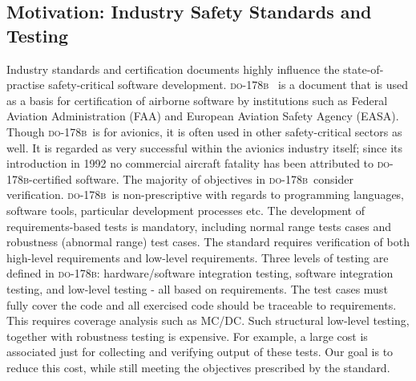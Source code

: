 \documentclass[sttt,final]{svjour}
\newcommand{\DOB}{\textsc{do-178b}}
\begin{document}
\subsection{Motivation: Industry Safety Standards and Testing}
Industry standards and certification documents highly influence the
state-of-practise safety-critical software development. \DOB\
\cite{do178b} is a document that is used as a basis for certification
of airborne software by institutions such as Federal Aviation
Administration (FAA) and European Aviation Safety Agency
(EASA). Though \DOB\ is for avionics, it is often used in other
safety-critical sectors as well. It is regarded as very successful
within the avionics industry itself; since its introduction in 1992 no
commercial aircraft fatality has been attributed to \DOB-certified
software. The majority of objectives in \DOB\ consider
verification. \DOB\ is non-prescriptive with regards to programming
languages, software tools, particular development processes etc. The
development of requirements-based tests is mandatory, including normal
range tests cases and robustness (abnormal range) test cases. The
standard requires verification of both high-level requirements and
low-level requirements. Three levels of testing are defined in \DOB:
hardware/software integration testing, software integration testing,
and low-level testing - all based on requirements. The test cases must
fully cover the code and all exercised code should be traceable to
requirements. This requires coverage analysis such as MC/DC. Such
structural low-level testing, together with robustness testing is
expensive. For example, a large cost is associated just for collecting
and verifying output of these tests. Our goal is to reduce this cost,
while still meeting the objectives prescribed by the standard.
\end{document}
